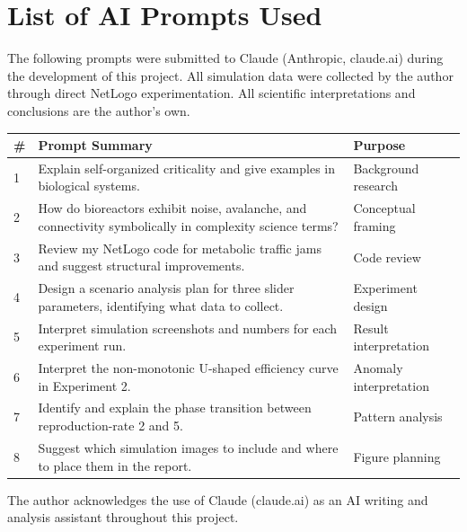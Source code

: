 \documentclass[12pt]{article}
\begin{document}
\appendix
\section{List of AI Prompts Used}

The following prompts were submitted to Claude (Anthropic, claude.ai) during the development of this project. All simulation data were collected by the author through direct NetLogo experimentation. All scientific interpretations and conclusions are the author's own.

\begin{table}[H]
  \centering
  \small
  \begin{tabular}{|p{0.5cm}|p{8.5cm}|p{3cm}|}
    \hline
    \textbf{\#} & \textbf{Prompt Summary} & \textbf{Purpose} \\
    \hline
    1 & Explain self-organized criticality and give examples in biological systems. & Background research \\
    \hline
    2 & How do bioreactors exhibit noise, avalanche, and connectivity symbolically in complexity science terms? & Conceptual framing \\
    \hline
    3 & Review my NetLogo code for metabolic traffic jams and suggest structural improvements. & Code review \\
    \hline
    4 & Design a scenario analysis plan for three slider parameters, identifying what data to collect. & Experiment design \\
    \hline
    5 & Interpret simulation screenshots and numbers for each experiment run. & Result interpretation \\
    \hline
    6 & Interpret the non-monotonic U-shaped efficiency curve in Experiment 2. & Anomaly interpretation \\
    \hline
    7 & Identify and explain the phase transition between reproduction-rate 2 and 5. & Pattern analysis \\
    \hline
    8 & Suggest which simulation images to include and where to place them in the report. & Figure planning \\
    \hline
  \end{tabular}
\end{table}

The author acknowledges the use of Claude (claude.ai) as an AI writing and analysis assistant throughout this project.
\end{document}
